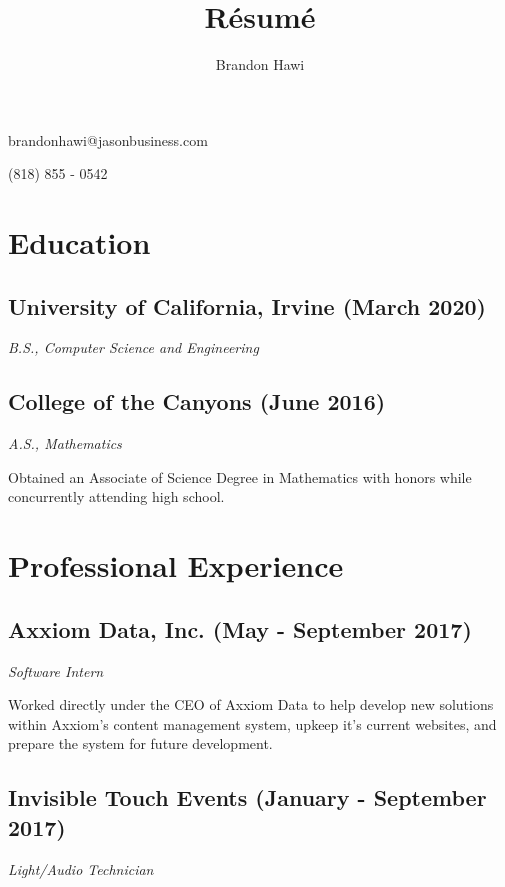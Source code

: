 \documentclass{article}
\makeatletter
\renewcommand{\maketitle}
{
\begin{flushleft}
\huge
\textbf{\theauthor}
\small

brandonhawi@jasonbusiness.com

(818) 855 - 0542
\end{flushleft}
}
\makeatother
\begin{document}
\title{R\'esum\'e}
\author{Brandon Hawi}

\maketitle
\vspace{-0.1in}
\section{Education}

\subsection{University of California, Irvine (March 2020)}
\textit{B.S., Computer Science and Engineering}

\subsection{College of the Canyons (June 2016)}
\textit{A.S., Mathematics}

Obtained an Associate of Science Degree in Mathematics with honors while concurrently attending
high school.

\section{Professional Experience}

%
%
%
\subsection{Axxiom Data, Inc. (May - September 2017)}

\textit{Software Intern}

Worked directly under the CEO of Axxiom Data to help develop new solutions within Axxiom's
content management system, upkeep it's current websites, and prepare the system for future development.

\subsection{Invisible Touch Events (January - September 2017)} 

\textit{Light/Audio Technician}
\end{document}
